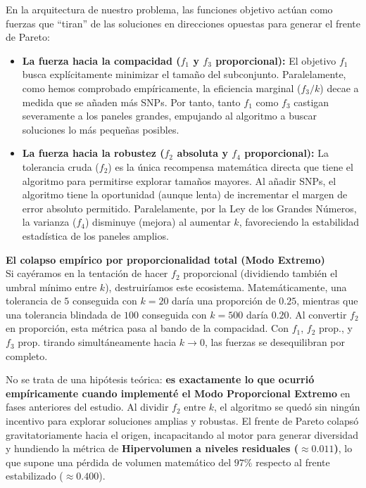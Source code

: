 \documentclass[11pt,a4paper]{article}
\begin{document}
En la arquitectura de nuestro problema, las funciones objetivo actúan como fuerzas que ``tiran'' de las soluciones en direcciones opuestas para generar el frente de Pareto:
\begin{itemize}
    \item \textbf{La fuerza hacia la compacidad ($f_1$ y $f_3$ proporcional):} El objetivo $f_1$ busca explícitamente minimizar el tamaño del subconjunto. Paralelamente, como hemos comprobado empíricamente, la eficiencia marginal ($f_3 / k$) decae a medida que se añaden más SNPs. Por tanto, tanto $f_1$ como $f_3$ castigan severamente a los paneles grandes, empujando al algoritmo a buscar soluciones lo más pequeñas posibles.
    \item \textbf{La fuerza hacia la robustez ($f_2$ absoluta y $f_4$ proporcional):} La tolerancia cruda ($f_2$) es la única recompensa matemática directa que tiene el algoritmo para permitirse explorar tamaños mayores. Al añadir SNPs, el algoritmo tiene la oportunidad (aunque lenta) de incrementar el margen de error absoluto permitido. Paralelamente, por la Ley de los Grandes Números, la varianza ($f_4$) disminuye (mejora) al aumentar $k$, favoreciendo la estabilidad estadística de los paneles amplios.
\end{itemize}

\textbf{El colapso empírico por proporcionalidad total (Modo Extremo)}\\
Si cayéramos en la tentación de hacer $f_2$ proporcional (dividiendo también el umbral mínimo entre $k$), destruiríamos este ecosistema. Matemáticamente, una tolerancia de $5$ conseguida con $k=20$ daría una proporción de $0.25$, mientras que una tolerancia blindada de $100$ conseguida con $k=500$ daría $0.20$. Al convertir $f_2$ en proporción, esta métrica pasa al bando de la compacidad. Con $f_1$, $f_2$ prop., y $f_3$ prop. tirando simultáneamente hacia $k \rightarrow 0$, las fuerzas se desequilibran por completo.

No se trata de una hipótesis teórica: \textbf{es exactamente lo que ocurrió empíricamente cuando implementé el Modo Proporcional Extremo} en fases anteriores del estudio. Al dividir $f_2$ entre $k$, el algoritmo se quedó sin ningún incentivo para explorar soluciones amplias y robustas. El frente de Pareto colapsó gravitatoriamente hacia el origen, incapacitando al motor para generar diversidad y hundiendo la métrica de \textbf{Hipervolumen a niveles residuales ($\approx 0.011$)}, lo que supone una pérdida de volumen matemático del $97\%$ respecto al frente estabilizado ($\approx 0.400$).
\end{document}
